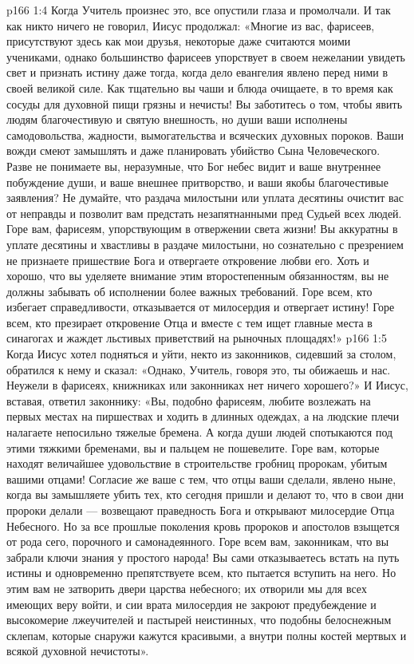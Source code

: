 \vs p166 1:4 Когда Учитель произнес это, все опустили глаза и промолчали. И так как никто ничего не говорил, Иисус продолжал: «Многие из вас, фарисеев, присутствуют здесь как мои друзья, некоторые даже считаются моими учениками, однако большинство фарисеев упорствует в своем нежелании увидеть свет и признать истину даже тогда, когда дело евангелия явлено перед ними в своей великой силе. Как тщательно вы чаши и блюда очищаете, в то время как сосуды для духовной пищи грязны и нечисты! Вы заботитесь о том, чтобы явить людям благочестивую и святую внешность, но души ваши исполнены самодовольства, жадности, вымогательства и всяческих духовных пороков. Ваши вожди смеют замышлять и даже планировать убийство Сына Человеческого. Разве не понимаете вы, неразумные, что Бог небес видит и ваше внутреннее побуждение души, и ваше внешнее притворство, и ваши якобы благочестивые заявления? Не думайте, что раздача милостыни или уплата десятины очистит вас от неправды и позволит вам предстать незапятнанными пред Судьей всех людей. Горе вам, фарисеям, упорствующим в отвержении света жизни! Вы аккуратны в уплате десятины и хвастливы в раздаче милостыни, но сознательно с презрением не признаете пришествие Бога и отвергаете откровение любви его. Хоть и хорошо, что вы уделяете внимание этим второстепенным обязанностям, вы не должны забывать об исполнении более важных требований. Горе всем, кто избегает справедливости, отказывается от милосердия и отвергает истину! Горе всем, кто презирает откровение Отца и вместе с тем ищет главные места в синагогах и жаждет льстивых приветствий на рыночных площадях!»
\vs p166 1:5 \pc Когда Иисус хотел подняться и уйти, некто из законников, сидевший за столом, обратился к нему и сказал: «Однако, Учитель, говоря это, ты обижаешь и нас. Неужели в фарисеях, книжниках или законниках нет ничего хорошего?» И Иисус, вставая, ответил законнику: «Вы, подобно фарисеям, любите возлежать на первых местах на пиршествах и ходить в длинных одеждах, а на людские плечи налагаете непосильно тяжелые бремена. А когда души людей спотыкаются под этими тяжкими бременами, вы и пальцем не пошевелите. Горе вам, которые находят величайшее удовольствие в строительстве гробниц пророкам, убитым вашими отцами! Согласие же ваше с тем, что отцы ваши сделали, явлено ныне, когда вы замышляете убить тех, кто сегодня пришли и делают то, что в свои дни пророки делали --- возвещают праведность Бога и открывают милосердие Отца Небесного. Но за все прошлые поколения кровь пророков и апостолов взыщется от рода сего, порочного и самонадеянного. Горе всем вам, законникам, что вы забрали ключи знания у простого народа! Вы сами отказываетесь встать на путь истины и одновременно препятствуете всем, кто пытается вступить на него. Но этим вам не затворить двери царства небесного; их отворили мы для всех имеющих веру войти, и сии врата милосердия не закроют предубеждение и высокомерие лжеучителей и пастырей неистинных, что подобны белоснежным склепам, которые снаружи кажутся красивыми, а внутри полны костей мертвых и всякой духовной нечистоты».
